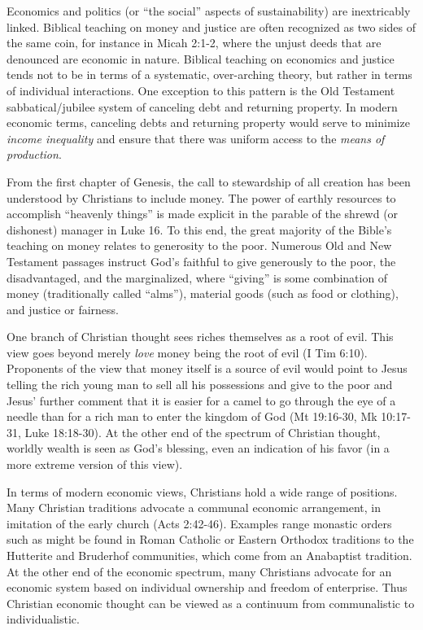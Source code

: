 \documentclass[12pt]{article}
\begin{document}
Economics and politics (or ``the social'' aspects of sustainability) are inextricably linked. Biblical teaching on money
and justice are often recognized as two sides of the same coin, for instance in Micah 2:1-2, where the unjust deeds that
are denounced are economic in nature. Biblical teaching on economics and justice tends not to be in terms of a
systematic, over-arching theory, but rather in terms of individual interactions.
One exception to this pattern is the Old Testament sabbatical/jubilee system of canceling debt and returning property. 
In modern economic terms, canceling debts and returning property would serve to minimize 
\emph{income inequality} and ensure that there was uniform access to the \emph{means of production}.

From the first chapter of Genesis, the call to stewardship of all creation has
been understood by Christians to include money. The power of earthly resources to accomplish ``heavenly things'' is made
explicit in the parable of the shrewd (or dishonest) manager in Luke 16. To this end, the great majority of the Bible's
teaching on money relates to generosity to the poor. Numerous Old and New Testament passages instruct God's faithful to
give generously to the poor, the disadvantaged, and the marginalized, where ``giving'' is some combination of money
(traditionally called ``alms''), material goods (such as food or clothing), and justice or fairness.

One branch of Christian thought sees riches themselves as a root of evil. This view goes beyond merely \emph{love} money
being the root of evil (I Tim 6:10). Proponents of the view that money itself is a source of evil would point to Jesus
telling the rich young man to sell all his possessions and give to the poor and Jesus' further comment that it is easier
for a camel to go through the eye of a needle than for a rich man to enter the kingdom of God (Mt 19:16-30, Mk 10:17-31,
Luke 18:18-30). At the other end of the spectrum of Christian thought, worldly wealth is seen as God's blessing, even an
indication of his favor (in a more extreme version of this view).

In terms of modern economic views, Christians hold a wide range of positions. Many Christian traditions advocate a communal
economic arrangement, in imitation of the early church (Acts 2:42-46). Examples range monastic orders such as might be found
in Roman Catholic or Eastern Orthodox traditions to the Hutterite and Bruderhof communities, which come from an Anabaptist tradition.
At the other end of the economic spectrum, many Christians advocate for an economic system based on individual ownership
and freedom of enterprise. Thus Christian economic thought can be viewed as a continuum from communalistic to individualistic.
\end{document}
